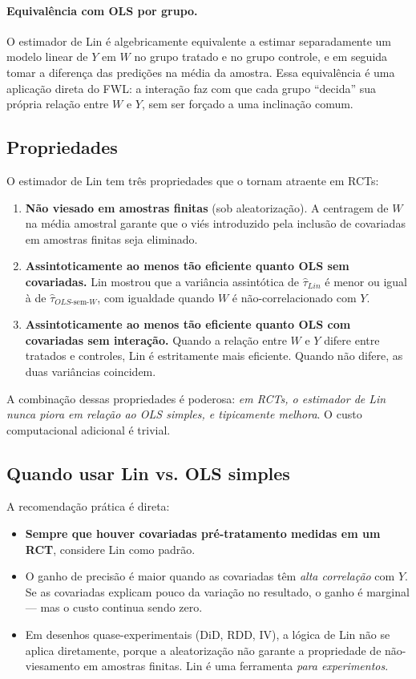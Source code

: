 \paragraph{Equivalência com OLS por grupo.} O estimador de Lin é algebricamente equivalente a estimar separadamente um modelo linear de $Y$ em $W$ no grupo tratado e no grupo controle, e em seguida tomar a diferença das predições na média da amostra. Essa equivalência é uma aplicação direta do FWL: a interação faz com que cada grupo ``decida'' sua própria relação entre $W$ e $Y$, sem ser forçado a uma inclinação comum.

\subsection*{Propriedades}

O estimador de Lin tem três propriedades que o tornam atraente em RCTs:

\begin{enumerate}
  \item \textbf{Não viesado em amostras finitas} (sob aleatorização). A centragem de $W$ na média amostral garante que o viés introduzido pela inclusão de covariadas em amostras finitas seja eliminado.

  \item \textbf{Assintoticamente ao menos tão eficiente quanto OLS sem covariadas.} Lin mostrou que a variância assintótica de $\hat{\tau}_{Lin}$ é menor ou igual à de $\hat{\tau}_{OLS\text{-sem-}W}$, com igualdade quando $W$ é não-correlacionado com $Y$.

  \item \textbf{Assintoticamente ao menos tão eficiente quanto OLS com covariadas sem interação.} Quando a relação entre $W$ e $Y$ difere entre tratados e controles, Lin é estritamente mais eficiente. Quando não difere, as duas variâncias coincidem.
\end{enumerate}

A combinação dessas propriedades é poderosa: \textit{em RCTs, o estimador de Lin nunca piora em relação ao OLS simples, e tipicamente melhora}. O custo computacional adicional é trivial.

\subsection*{Quando usar Lin vs. OLS simples}

A recomendação prática é direta:
\begin{itemize}
  \item \textbf{Sempre que houver covariadas pré-tratamento medidas em um RCT}, considere Lin como padrão.
  \item O ganho de precisão é maior quando as covariadas têm \textit{alta correlação} com $Y$. Se as covariadas explicam pouco da variação no resultado, o ganho é marginal --- mas o custo continua sendo zero.
  \item Em desenhos quase-experimentais (DiD, RDD, IV), a lógica de Lin não se aplica diretamente, porque a aleatorização não garante a propriedade de não-viesamento em amostras finitas. Lin é uma ferramenta \textit{para experimentos}.
\end{itemize}

